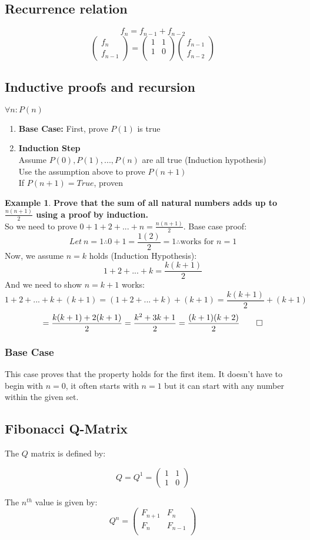 \documentclass{article}
\theoremstyle{definition}
\newtheorem{ex}{Example}[section]
\begin{document}
  \subsection{Recurrence relation}
  \[f_n = f_{n-1} + f_{n-2}\]
  \[
    \begin{pmatrix}
      f_n \\
      f_{n-1}
    \end{pmatrix} = \begin{pmatrix}
    1 & 1 \\
    1 & 0 \\
    \end{pmatrix} \begin{pmatrix}
    f_{n-1} \\
    f_{n-2}
    \end{pmatrix}
  \]
  \subsection{Inductive proofs and recursion}
  $\forall n : P(n)$
  \begin{enumerate}
    \item \textbf{Base Case:} First, prove $P(1)$ is true
    \item \textbf{Induction Step} \\
      Assume $P(0), P(1), ..., P(n)$ are all true (Induction hypothesis)\\
      Use the assumption above to prove $P(n+1)$\\
      If $P(n+1) = True$, proven
  \end{enumerate}

  \begin{ex}
    \textbf{Prove that the sum of all natural numbers adds up to $\frac{n(n+1)}{2}$ using a proof by induction.}\\
    So we need to prove $0+1+2+...+n=\frac{n(n+1)}{2}$. Base case proof:
    \[Let\ n = 1 \therefore 0+1 = \frac{1(2)}{2} = 1 \therefore \text{works for }n=1\]
    Now, we assume $n=k$ holds (Induction Hypothesis):
    \[1+2+...+k=\frac{k(k+1)}{2}\]
    And we need to show $n=k+1$ works:
    \[1+2+...+k+(k+1) = (1+2+...+k)+(k+1) = \frac{k(k+1)}{2}+(k+1)\]
    \[=\frac{k(k+1) + 2(k+1)}{2} = \frac{k^2+3k+1}{2} = \frac{(k+1)(k+2)}{2} \qed\]
  \end{ex}

  \subsubsection{Base Case}
  This case proves that the property holds for the first item. It doesn't have to begin with $n=0$, it often starts with $n=1$ but it can start with any number within the given set.
  \subsection{Fibonacci Q-Matrix}
  The $Q$ matrix is defined by:
  
  \[Q = Q^1 = \begin{pmatrix}
    1 & 1 \\
    1 & 0
  \end{pmatrix}
  \]

The $n^{th}$ value is given by:\[
Q^n = \begin{pmatrix}
  F_{n+1} & F_n \\
  F_n & F_{n-1} \\
\end{pmatrix}
  \]
\end{document}

